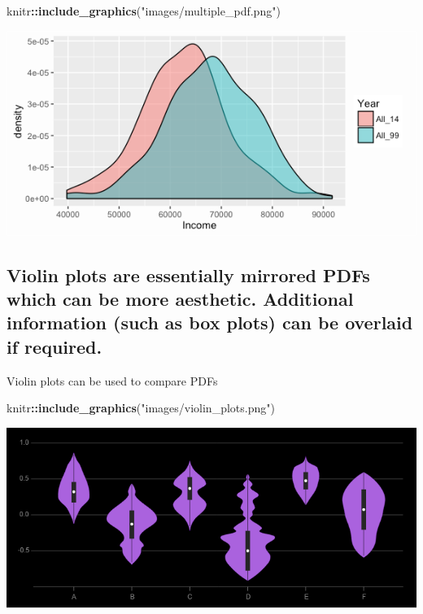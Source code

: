 \documentclass[]{book}
\newenvironment{Shaded}{\begin{snugshade}}{\end{snugshade}}
\newcommand{\KeywordTok}[1]{\textcolor[rgb]{0.13,0.29,0.53}{\textbf{#1}}}
\newcommand{\StringTok}[1]{\textcolor[rgb]{0.31,0.60,0.02}{#1}}
\newcommand{\OperatorTok}[1]{\textcolor[rgb]{0.81,0.36,0.00}{\textbf{#1}}}
\newcommand{\NormalTok}[1]{#1}
\begin{document}
\begin{Shaded}
\begin{Highlighting}[]
\NormalTok{knitr}\OperatorTok{::}\KeywordTok{include_graphics}\NormalTok{(}\StringTok{"images/multiple_pdf.png"}\NormalTok{)}
\end{Highlighting}
\end{Shaded}

\begin{center}\includegraphics{images/multiple_pdf} \end{center}

\subsection{Violin plots are essentially mirrored PDFs which can be more
aesthetic. Additional information (such as box plots) can be overlaid if
required.}\label{violin-plots-are-essentially-mirrored-pdfs-which-can-be-more-aesthetic.-additional-information-such-as-box-plots-can-be-overlaid-if-required.}

 Violin plots can be used to compare PDFs

\begin{Shaded}
\begin{Highlighting}[]
\NormalTok{knitr}\OperatorTok{::}\KeywordTok{include_graphics}\NormalTok{(}\StringTok{"images/violin_plots.png"}\NormalTok{)}
\end{Highlighting}
\end{Shaded}

\begin{center}\includegraphics{images/violin_plots} \end{center}
\end{document}
